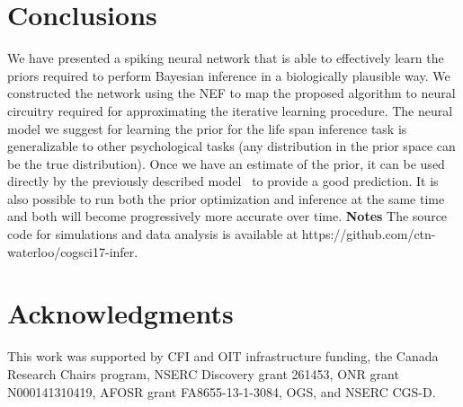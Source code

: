 \documentclass[10pt,letterpaper]{article}
\begin{document}
\section{Conclusions}


We have presented a spiking neural network that is able to effectively learn the priors required to perform Bayesian inference in a biologically plausible way.  We constructed the network using the NEF to map the proposed algorithm to neural circuitry required for approximating the iterative learning procedure. The neural model we suggest for learning the prior for the life span inference task is generalizable to other psychological tasks (any distribution in the prior space can be the true distribution). Once we have an estimate of the prior, it can be used directly by the previously described model~\cite{sharma2017} to provide a good prediction. It is also possible to run both the prior optimization and inference at the same time and both will become progressively more accurate over time. \newline \textbf{Notes} \hspace{0.3cm} The source code for simulations and data analysis is available at https://github.com/ctn-waterloo/cogsci17-infer.


\section{Acknowledgments}
This work was supported by CFI and OIT infrastructure funding, the Canada Research Chairs program, NSERC Discovery grant 261453, ONR grant N000141310419, AFOSR grant FA8655-13-1-3084, OGS, and NSERC CGS-D.



\setlength{\bibleftmargin}{.125in}
\setlength{\bibindent}{-\bibleftmargin}


\end{document}
